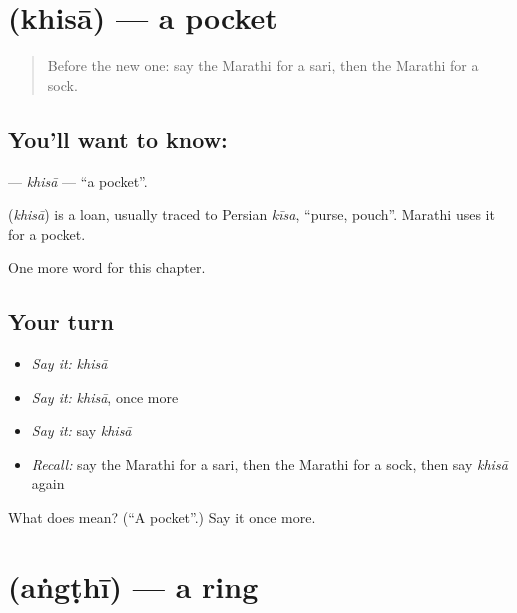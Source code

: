 \section[\texorpdfstring{\mr{खिसा} (khisā)}{खिसा (khisā)}]{ (khisā) — a pocket}

\label{lesson:MR-C116-khisa}



\begin{quote}
Before the new one: say the Marathi for a sari, then the Marathi for a sock.
\end{quote}

\subsection*{You'll want to know: }
\textbf{} — \emph{khisā} — \textquotedblleft{}a pocket\textquotedblright{}.

\begin{cousinweb}
\textbf{} (\emph{khisā}) is a loan, usually traced to Persian \emph{kīsa}, \textquotedblleft{}purse, pouch\textquotedblright{}. Marathi uses it for a pocket.
\end{cousinweb}

\begin{grammarlens}[title={What you've built}]
One more word for this chapter.
\end{grammarlens}

\subsection*{Your turn}
\begin{itemize}
\raggedright
  \item \emph{Say it:} \emph{khisā}
  \item \emph{Say it:} \emph{khisā}, once more
  \item \emph{Say it:} say \emph{khisā}
  \item \emph{Recall:} say the Marathi for a sari, then the Marathi for a sock, then say \emph{khisā} again
\end{itemize}

\begin{tcolorbox}[breakable,colback=teal!4,colframe=teal!35!black,title={Before you move on}]
What does  mean? (\textquotedblleft{}A pocket\textquotedblright{}.) Say it once more.
\end{tcolorbox}
\section[\texorpdfstring{\mr{अंगठी} (aṅgṭhī)}{अंगठी (aṅgṭhī)}]{ (aṅgṭhī) — a ring}

